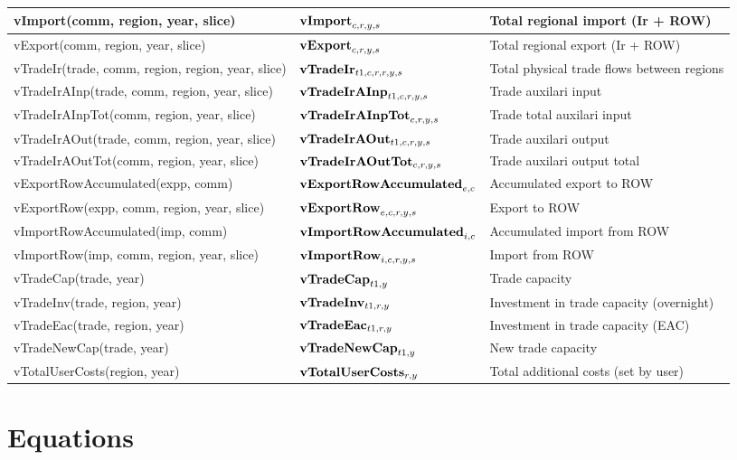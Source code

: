 \documentclass{article}
\begin{document}
\begin{longtable}{|p{10cm}|p{5cm}|p{9cm}|}
 \hline
vImport(comm, region, year, slice) & ${\bf vImport}_{c,r,y,s}$ & Total regional import (Ir + ROW) \\ 
 \hline
vExport(comm, region, year, slice) & ${\bf vExport}_{c,r,y,s}$ & Total regional export (Ir + ROW) \\ 
 \hline
vTradeIr(trade, comm, region, region, year, slice) & ${\bf vTradeIr}_{t1,c,r,r,y,s}$ & Total physical trade flows between regions \\ 
 \hline
vTradeIrAInp(trade, comm, region, year, slice) & ${\bf vTradeIrAInp}_{t1,c,r,y,s}$ & Trade auxilari input \\ 
 \hline
vTradeIrAInpTot(comm, region, year, slice) & ${\bf vTradeIrAInpTot}_{c,r,y,s}$ & Trade total auxilari input \\ 
 \hline
vTradeIrAOut(trade, comm, region, year, slice) & ${\bf vTradeIrAOut}_{t1,c,r,y,s}$ & Trade auxilari output \\ 
 \hline
vTradeIrAOutTot(comm, region, year, slice) & ${\bf vTradeIrAOutTot}_{c,r,y,s}$ & Trade auxilari output total \\ 
 \hline
vExportRowAccumulated(expp, comm) & ${\bf vExportRowAccumulated}_{e,c}$ & Accumulated export to ROW \\ 
 \hline
vExportRow(expp, comm, region, year, slice) & ${\bf vExportRow}_{e,c,r,y,s}$ & Export to ROW \\ 
 \hline
vImportRowAccumulated(imp, comm) & ${\bf vImportRowAccumulated}_{i,c}$ & Accumulated import from ROW \\ 
 \hline
vImportRow(imp, comm, region, year, slice) & ${\bf vImportRow}_{i,c,r,y,s}$ & Import from ROW \\ 
 \hline
vTradeCap(trade, year) & ${\bf vTradeCap}_{t1,y}$ & Trade capacity \\ 
 \hline
vTradeInv(trade, region, year) & ${\bf vTradeInv}_{t1,r,y}$ & Investment in trade capacity (overnight) \\ 
 \hline
vTradeEac(trade, region, year) & ${\bf vTradeEac}_{t1,r,y}$ & Investment in trade capacity (EAC) \\ 
 \hline
vTradeNewCap(trade, year) & ${\bf vTradeNewCap}_{t1,y}$ & New trade capacity \\ 
 \hline
vTotalUserCosts(region, year) & ${\bf vTotalUserCosts}_{r,y}$ & Total additional costs (set by user) \\ 
 \hline
\end{longtable}

\section*{Equations}
\end{document}
